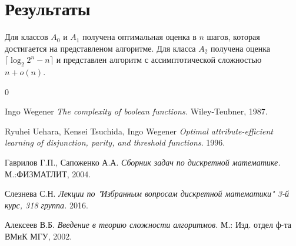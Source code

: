 \documentclass[oneside, final, 12pt]{extreport}
\begin{document}
	\section{Результаты}
	
	Для классов $A_0$ и $A_1$ получена оптимальная оценка в $n$ шагов, которая достигается на представленом алгоритме. Для класса $A_2$ получена оценка
	$\lceil \log_2{2^n - n} \rceil$ и представлен алгоритм с ассимптотической сложностью $n + o(n)$.
	
	\begin{thebibliography} {0}
		
		 Ingo Wegener \emph{The complexity of boolean functions.} Wiley-Teubner, 1987.
		
		 Ryuhei Uehara, Kensei Tsuchida, Ingo Wegener \emph{Optimal attribute-efficient learning of disjunction, parity, and threshold functions}. 1996.
		
		 Гаврилов Г.П., Сапоженко А.А. \emph{Сборник задач по дискретной математике.} М.:ФИЗМАТЛИТ, 2004.
		
		 Слезнева С.Н. \emph{Лекции по "Избранным вопросам дискретной математики" 3-й курс, 318 группа.} 2016.
		
		 Алексеев В.Б. \emph{Введение в теорию сложности алгоритмов.} М.: Изд. отдел ф-та ВМиК МГУ, 2002.
		
	\end{thebibliography}
\end{document}
